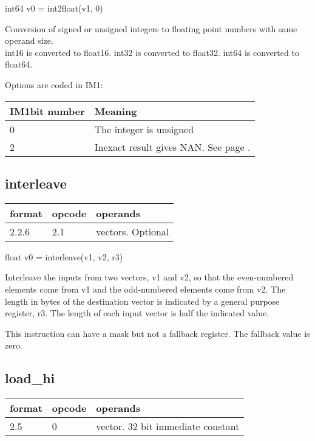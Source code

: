 \documentclass[forwardcom.tex]{subfiles}
\begin{document}
int64 v0 = int2float(v1, 0)
\vv

Conversion of signed or unsigned integers to floating point numbers with same operand size.\\
int16 is converted to float16. int32 is converted to float32. int64 is converted to float64.
\vv

Options are coded in IM1:

\label{table:int2floatOptions}
\begin{tabular}{|p{20mm}|p{120mm}|}
\hline
\bfseries IM1\newline bit number & \bfseries Meaning \\ \hline
0 & The integer is unsigned \\
2 & Inexact result gives NAN. See page \pageref{table:FPExceptionResults}.
\\ \hline
\end{tabular}
\vv


\subsection{interleave}
\label{table:interleaveInstruction}
\begin{tabular}{|p{12mm}|p{15mm}|p{100mm}|}
\hline
\bfseries format & \bfseries opcode & \bfseries operands \\ \hline
2.2.6 & 2.1 & vectors. Optional \\ \hline
\end{tabular}
\vv

float v0 = interleave(v1, v2, r3)
\vv

Interleave the inputs from two vectors, v1 and v2, so that the even-numbered elements come from v1 and the odd-numbered elements come from v2. The length in bytes of the destination vector is indicated by a general purpose register, r3. The length of each input vector is half the indicated value.
\vv

This instruction can have a mask but not a fallback register. The fallback value is zero.
\vv

\subsection{load\_hi}
\label{table:loadHiInstruction}
\begin{tabular}{|p{12mm}|p{15mm}|p{100mm}|}
\hline
\bfseries format & \bfseries opcode & \bfseries operands \\ \hline
2.5 & 0 & vector. 32 bit immediate constant \\ \hline
\end{tabular}
\vv
\end{document}
